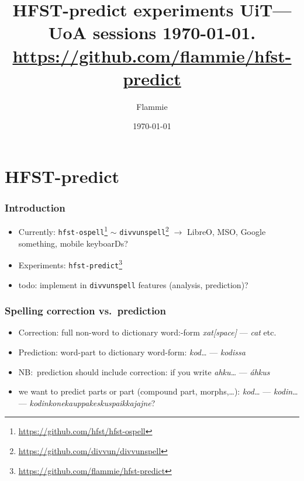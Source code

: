 \documentclass{beamer}
\title{HFST-predict experiments
\scriptsize{UiT---UoA sessions \today.
\url{https://github.com/flammie/hfst-predict}}}
\author{Flammie }
\institute{UiT}
\date{\today}
\begin{document}

\maketitle

\section{HFST-predict}

\begin{frame}
    \frametitle{Introduction}
    \begin{itemize}
        \item Currently:
            \texttt{hfst-ospell}\footnote{\url{https://github.com/hfst/hfst-ospell}}
            $\sim$
            \texttt{divvunspell}\footnote{\url{https://github.com/divvun/divvunspell}}
            $\rightarrow$
            LibreO, MSO, Google something, mobile keyboarDs?
        \item Experiments:
            \texttt{hfst-predict}\footnote{\url{https://github.com/flammie/hfst-predict}}
        \item todo: implement in \texttt{divvunspell} features (analysis,
            prediction)?
    \end{itemize}
\end{frame}

\begin{frame}
    \frametitle{Spelling correction vs.\ prediction}
    \begin{itemize}
        \item Correction: full non-word to dictionary word:-form
            \textit{xat[space]} --- \textit{cat} etc.
        \item Prediction: word-part to dictionary word-form:
            \textit{kod\ldots} --- \textit{kodissa}
        \item NB:\ prediction should include correction: if you write
            \textit{ahku\ldots} --- \textit{áhkus}
        \item we want to predict parts or part (compound part, morphs,\ldots):
            \textit{kod\ldots} --- \textit{kodin\ldots} ---
            \textit{kodinkonekauppakeskuspaikkajajne}?
    \end{itemize}
\end{frame}
\end{document}
